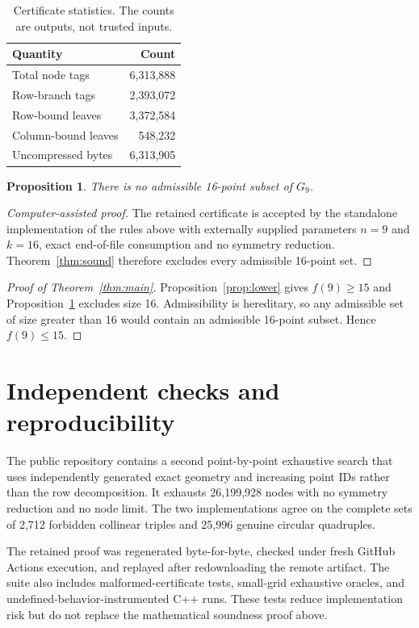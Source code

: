 \documentclass[11pt,a4paper]{article}
\newtheorem{proposition}[theorem]{Proposition}
\theoremstyle{definition}
\theoremstyle{remark}
\begin{document}
\begin{table}[ht]
\centering
\begin{tabular}{lr}
\toprule
Quantity & Count\\
\midrule
Total node tags & 6,313,888\\
Row-branch tags & 2,393,072\\
Row-bound leaves & 3,372,584\\
Column-bound leaves & 548,232\\
Uncompressed bytes & 6,313,905\\
\bottomrule
\end{tabular}
\caption{Certificate statistics. The counts are outputs, not trusted inputs.}
\label{tab:counts}
\end{table}

\begin{proposition}\label{prop:upper}
There is no admissible 16-point subset of $G_9$.
\end{proposition}
\begin{proof}[Computer-assisted proof]
The retained certificate is accepted by the standalone implementation of the
rules above with externally supplied parameters $n=9$ and $k=16$, exact
end-of-file consumption and no symmetry reduction. Theorem~\ref{thm:sound}
therefore excludes every admissible 16-point set.
\end{proof}

\begin{proof}[Proof of Theorem~\ref{thm:main}]
Proposition~\ref{prop:lower} gives $f(9)\ge15$ and
Proposition~\ref{prop:upper} excludes size 16. Admissibility is hereditary,
so any admissible set of size greater than 16 would contain an admissible
16-point subset. Hence $f(9)\le15$.
\end{proof}

\section{Independent checks and reproducibility}
The public repository contains a second point-by-point exhaustive search that
uses independently generated exact geometry and increasing point IDs rather
than the row decomposition. It exhausts 26,199,928 nodes with no symmetry
reduction and no node limit. The two implementations agree on the complete
sets of 2,712 forbidden collinear triples and 25,996 genuine circular
quadruples.

The retained proof was regenerated byte-for-byte, checked under fresh GitHub
Actions execution, and replayed after redownloading the remote artifact. The
suite also includes malformed-certificate tests, small-grid exhaustive oracles,
and undefined-behavior-instrumented C++ runs. These tests reduce implementation
risk but do not replace the mathematical soundness proof above.
\end{document}
